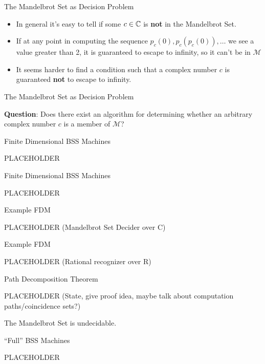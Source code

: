 \documentclass[c]{beamer}
\begin{document}
\begin{frame}{The Mandelbrot Set as Decision Problem}
  
  \begin{itemize}
  \item In general it's easy to tell if some $c \in \mathbb{C}$ is
    \textbf{not} in the Mandelbrot Set.\pause
  \item If at any point in computing the sequence $p_c(0),
    p_c(p_c(0)), \ldots$ we see a value greater than 2, it is
    guaranteed to escape to infinity, so it can't be in
    $\mathcal{M}$\pause
  \item It seems harder to find a condition such that a complex number
    $c$ is guaranteed \textbf{not} to escape to infinity.
  \end{itemize}
\end{frame}

\begin{frame}{The Mandelbrot Set as Decision Problem}
  
  \textbf{Question}: Does there exist an algorithm for determining
  whether an arbitrary complex number $c$ is a member of
  $\mathcal{M}$?
  
\end{frame}

\begin{frame}{Finite Dimensional BSS Machines}

  PLACEHOLDER
  
\end{frame}

\begin{frame}{Finite Dimensional BSS Machines}

  PLACEHOLDER
  
\end{frame}

\begin{frame}{Example FDM}
  
  PLACEHOLDER (Mandelbrot Set Decider over C)
 
\end{frame}

\begin{frame}{Example FDM}
  
  PLACEHOLDER (Rational recognizer over R)
 
\end{frame}

\begin{frame}{Path Decomposition Theorem}

  PLACEHOLDER (State, give proof idea, maybe talk about computation
  paths/coincidence sets?)
  
\end{frame}

\begin{frame}
  \begin{corollary}
    The Mandelbrot Set is undecidable.
  \end{corollary}
\end{frame}

\begin{frame}{``Full'' BSS Machines}

  PLACEHOLDER

\end{frame}
\end{document}
